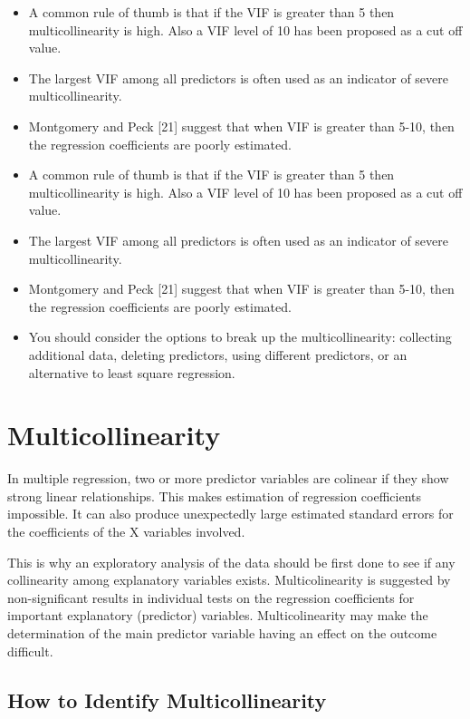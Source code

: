 \documentclass[]{report}
\begin{document}
\begin{itemize}
\item  A common rule of thumb is that if the VIF is greater than 5 then multicollinearity is high. Also a VIF
level of 10 has been proposed as a cut off value.
\item  The largest VIF among all predictors is often used as an indicator of severe multicollinearity.
\item  Montgomery and Peck [21] suggest that when VIF is greater than 5-10, then the regression coefficients are poorly estimated.
\item A common rule of thumb is that if the VIF is greater than 5 then multicollinearity is high.
Also a VIF level of 10 has been proposed as a cut off value.
\item The largest VIF among all predictors is often used as an indicator of severe multicollinearity. 
\item Montgomery and Peck [21] suggest that when VIF is greater than 5-10, then the regression coefficients are poorly estimated. \item You should
consider the options to break up the multicollinearity: collecting additional data, deleting
predictors, using different predictors, or an alternative to least square regression.
\end{itemize}







\newpage
\section{Multicollinearity}
In multiple regression, two or more predictor variables are colinear if they show strong linear relationships. This makes estimation of regression coefficients impossible. It can also produce unexpectedly large estimated standard errors for the coefficients of the X variables involved.

This is why an exploratory analysis of the data should be first done to see if any collinearity among explanatory variables exists. Multicolinearity is suggested by non-significant results in individual tests on the regression coefficients for important explanatory (predictor) variables. Multicolinearity may make the determination of the main predictor variable having an effect on the outcome difficult.

\subsection{How to Identify Multicollinearity}
\end{document}
